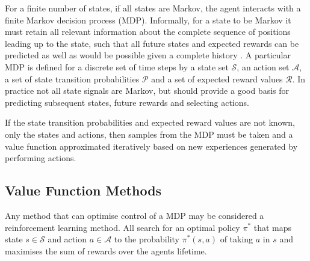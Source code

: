 
For a finite number of states, if all states are Markov, the agent interacts
with a finite Markov decision process (MDP).  Informally, for a state to be
Markov it must retain all relevant information about the complete sequence of
positions leading up to the state, such that all future states and expected
rewards can be predicted as well as would be possible given a complete history
\cite{suttonbarto:1998}.  A particular MDP is defined for a discrete set of time
steps by a state set $\mathscr{S}$, an action set $\mathscr{A}$, a set of state
transition probabilities $\mathscr{P}$ and a set of expected reward values
$\mathscr{R}$.
In practice not all state signals are Markov, but should provide a good basis
for predicting subsequent states, future rewards and selecting actions.

If the state transition probabilities and expected reward values are not known,
only the states and actions, then samples from the MDP must be taken and a value
function approximated iteratively based on new experiences generated by
performing actions.

\subsection{Value Function Methods}
\label{sec:valuebased}
Any method that can optimise control of a MDP may be considered a reinforcement
learning method.  All search for an optimal policy $\pi^*$ that maps state
$s \in \mathscr{S}$ and action $a \in \mathscr{A}$ to the probability
$\pi^*(s,a)$ of taking $a$ in $s$ and maximises the sum of rewards over the
agents lifetime.

